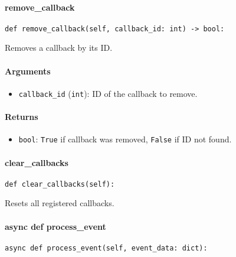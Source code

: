 \documentclass{article}
\begin{document}
\paragraph{remove\_callback}

\begin{lstlisting}[style=pythonstyle]
def remove_callback(self, callback_id: int) -> bool:
\end{lstlisting}

\noindent Removes a callback by its ID.

\paragraph{Arguments}

\begin{itemize}
    \item \lstinline[style=pythonstyle]|callback_id| (\lstinline[style=pythonstyle]|int|): ID of the callback to remove.
\end{itemize}

\paragraph{Returns}

\begin{itemize}
    \item \lstinline[style=pythonstyle]|bool|: \lstinline[style=pythonstyle]|True| if callback was removed, \lstinline[style=pythonstyle]|False| if ID not found.
\end{itemize}

\paragraph{clear\_callbacks}

\begin{lstlisting}[style=pythonstyle]
def clear_callbacks(self):
\end{lstlisting}

\noindent Resets all registered callbacks.

\paragraph{async def process\_event}

\begin{lstlisting}[style=pythonstyle]
async def process_event(self, event_data: dict):
\end{lstlisting}
\end{document}
